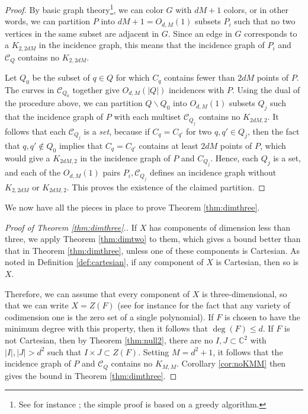 \documentclass{daj}
\theoremstyle{definition}
\newcommand{\C}{\mathbb C}
\newcommand{\cvs}{\mathcal C}
\begin{document}
\begin{proof}
By basic graph theory\footnote{See for instance \cite[Chapter 14]{BM}; the simple proof is based on a greedy algorithm.},
 we can color $G$ with $dM+1$ colors, or in other words, we can partition $P$ into $dM+1 = O_{d,M}(1)$ subsets $P_i$ such that no two vertices in the same subset are adjacent in $G$.
 Since an edge in $G$ corresponds to a $K_{2,2dM}$ in the incidence graph, 
 this means that the incidence graph of $P_i$ and $\cvs_Q$ contains no $K_{2,2dM}$.

Let $Q_0$ be the subset of $q\in Q$ for which $C_q$ contains fewer than $2dM$ points of $P$.
The curves in $\cvs_{Q_0}$ together give $O_{d,M}(|Q|)$ incidences with $P$.
Using the dual of the procedure above, we can partition $Q\backslash Q_0$ into $O_{d,M}(1)$ subsets $Q_j$ such that the incidence graph of $P$ with each multiset $\cvs_{Q_j}$ contains no $K_{2dM,2}$.
It follows that each $\cvs_{Q_j}$ is a \emph{set}, 
because if $C_q=C_{q'}$ for two $q,q'\in Q_j$, then the fact that $q,q'\not\in Q_0$ implies that $C_q = C_{q'}$ contains at least $2dM$ points of $P$,
which would give a $K_{2dM,2}$ in the incidence graph of $P$ and $C_{Q_j}$.
Hence, each $Q_j$ is a set, and each of the $O_{d,M}(1)$ pairs $P_i,\cvs_{Q_j}$ defines an incidence graph without $K_{2,2dM}$ or $K_{2dM,2}$.
This proves the existence of the claimed partition.
\end{proof}

We now have all the pieces in place to prove Theorem \ref{thm:dimthree}.

\begin{proof}[Proof of Theorem \ref{thm:dimthree}.]
If $X$ has components of dimension less than three, we apply Theorem \ref{thm:dimtwo} to them, which gives a bound better than that in Theorem \ref{thm:dimthree}, unless one of these components is Cartesian.
As noted in Definition \ref{def:cartesian}, 
if any component of $X$ is Cartesian, then so is $X$.

Therefore, we can assume that every component of $X$ is three-dimensional, 
so that we can write $X=Z(F)$ (see for instance \cite[Theorem 1.21]{Shaf} for the fact that any variety of codimension one is the zero set of a single polynomial). 
If $F$ is chosen to have the minimum degree with this property, then it follows that $\deg(F)\leq d$.
If $F$ is not Cartesian, then by Theorem \ref{thm:null2}, 
there are no $I,J\subset\C^2$ with $|I|,|J|>d^2$ such that $I\times J\subset Z(F)$.
Setting $M= d^2+1$, it follows that the incidence graph of $P$ and $\cvs_Q$ contains no $K_{M,M}$.
Corollary \ref{cor:noKMM} then gives the bound in Theorem \ref{thm:dimthree}.
\end{proof}
\end{document}
